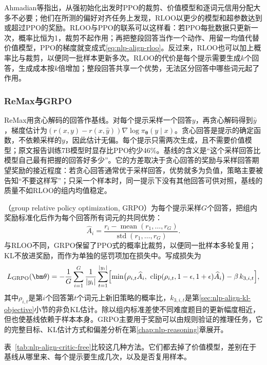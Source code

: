 Ahmadian等指出，从强初始化出发时PPO的裁剪、价值模型和逐词元信用分配大多不必要；他们在所测的偏好对齐任务上发现，RLOO以更少的模型和超参数达到或超过PPO的奖励。RLOO与PPO的联系可以这样看：若PPO每批数据只更新一次，概率比恒为1，裁剪不起作用；再把整段回答当作一个动作、用留一均值代替价值模型，PPO的梯度就变成式\eqref{eq:nlp-align-rloo}。反过来，RLOO也可以加上概率比与裁剪，以便同一批样本更新多次。RLOO的代价是每个提示需要生成$k$个回答，生成成本按$k$倍增加；整段回答共享一个优势，无法区分回答中哪些词元起了作用。

\subsubsection{ReMax与GRPO}
\label{sec:nlp-align-remax-grpo}

ReMax用贪心解码的回答作基线。对每个提示采样一个回答$y$，再贪心解码得到$\hat y$，梯度估计为$(r(x,y)-r(x,\hat y))\nabla\log\pi_{\bm\theta}(y\mid x)$。贪心回答是提示的确定函数，不依赖采样的$y$，因此估计无偏。每个提示只需两次生成，且不需要价值模型；原文报告训练7B模型时显存比PPO约少46\%。基线的含义是“这个采样回答比模型自己最有把握的回答好多少”。它的方差取决于贪心回答的奖励与采样回答期望奖励的接近程度：若贪心回答通常优于采样回答，优势就多为负值，策略主要被告知“不要这样写”；只采一个样本时，同一提示下没有其他回答可供对照，基线的质量不如RLOO的组内均值稳定。

（group relative policy optimization, GRPO）为每个提示采样$G$个回答，把组内奖励标准化后作为每个回答所有词元的共同优势\cite{rl5-shao2024deepseekmath}：
\[
 \widehat A_i=\frac{r_i-\operatorname{mean}(r_1,\ldots,r_G)}{\operatorname{std}(r_1,\ldots,r_G)}.
\]
与RLOO不同，GRPO保留了PPO式的概率比裁剪，以便同一批样本多轮复用；KL不放进奖励，而作为单独的惩罚项加在损失中。写成损失为
\[
 L_{\mathrm{GRPO}}(\bm\theta)=-\frac1G\sum_{i=1}^{G}\frac{1}{|y_i|}\sum_{t=1}^{|y_i|}
 \Bigl[\min\bigl(\rho_{i,t}\widehat A_i,\ \operatorname{clip}(\rho_{i,t},1-\epsilon,1+\epsilon)\widehat A_i\bigr)-\beta\,k_{3,i,t}\Bigr],
\]
其中$\rho_{i,t}$是第$i$个回答第$t$个词元上新旧策略的概率比，$k_{3,i,t}$是第\ref{sec:nlp-align-kl-objective}小节的非负KL估计。除以组内标准差使不同难度题目的更新幅度相近，但也使基线依赖于样本本身。GRPO主要用于奖励可以由规则验证的推理任务，它的完整目标、KL估计方式和偏差分析在第\ref{chap:nlp-reasoning}章展开。

表~\ref{tab:nlp-align-critic-free}比较这几种方法。它们都去掉了价值模型，差别在于基线从哪里来、每个提示要生成几次，以及是否复用样本。

